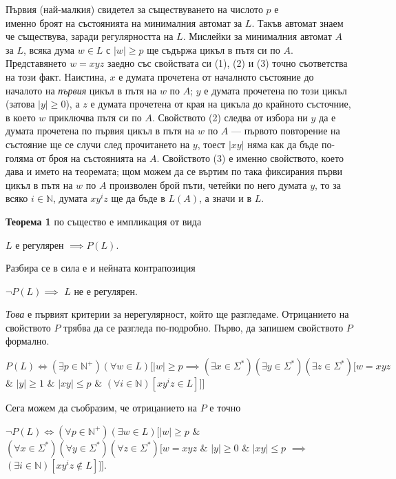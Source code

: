\documentclass{article}
\begin{document}
    \vspace{15pt}

    \hspace{15pt}Първия (най-малкия) свидетел за съществуването на числото $p$ е \\
    именно броят на състоянията на минималния автомат за $L$. Такъв автомат знаем че 
    съществува, заради регулярността на $L$. Мислейки за минималния автомат $A$ за $L$,
    всяка дума $w \in L$ с $|w| \geq p$ ще съдържа цикъл в пътя си по $A$. Представянето
    $w = xyz$ заедно със свойствата си (1), (2) и (3) точно съответства на този факт.
    Наистина, $x$ е думата прочетена от началното състояние до началото на \textit{първия}
    цикъл в пътя на $w$ по $A$; 
    $y$ е думата прочетена по този цикъл (затова $|y| \geq 0$), а $z$ е думата прочетена
    от края на цикъла до крайното състочние, в което $w$ приключва пътя си по $A$. 
    Свойството (2) следва от избора ни $y$ да е думата прочетена по първия цикъл в пътя
    на $w$ по $A$ — първото повторение на състояние ще се случи след прочитането на $y$,
    тоест $|xy|$ няма как да бъде по-голяма от броя на състоянията на $A$. Свойството
    (3) е именно свойството, което дава и името на теоремата; щом можем да се въртим
    по така фиксирания първи цикъл в пътя на $w$ по $A$ произволен брой пъти, четейки
    по него думата $y$, то за всяко $i \in \mathbb{N}$, думата $xy^iz$ ще да бъде в
    $L(A)$, а значи и в $L$. \\

    \vspace{15pt}

    \hspace{15pt} \textbf{Теорема 1} по същество е импликация от вида 
    \begin{center}
        $L$ е регулярен $\implies P(L)$. 
    \end{center}
    Разбира се в сила е и нейната контрапозиция
    \begin{center}
        $\neg P(L) \implies$ $L$ не е регулярен.
    \end{center}
    \textit{Това} е първият критерии за нерегулярност, който ще разгледаме. Отрицанието
    на свойството $P$ трябва да се разгледа по-подробно. Първо, да запишем свойството
    $P$ формално.
    \begin{center} 
        $P(L) \iff (\exists p \in \mathbb{N}^+)(\forall w \in L)[|w| \geq p \implies (\exists x \in \Sigma^*)(\exists y \in \Sigma^*)(\exists z \in \Sigma^*)[w = xyz$ $\&$ $|y| \geq 1$ $\&$ $|xy| \leq p$ $\&$ $(\forall i \in \mathbb{N})[xy^iz \in L]]]$
    \end{center}
    Сега можем да съобразим, че отрицанието на $P$ е точно
    \begin{center}
        $\neg P(L) \iff (\forall p \in \mathbb{N}^+)(\exists w \in L) [|w| \geq p$ $\&$ $(\forall x \in \Sigma^*)(\forall y \in \Sigma^*)(\forall z \in \Sigma^*)[w = xyz$ $\&$ $|y| \geq 0$ $\&$ $|xy| \leq p$ $\implies$ $(\exists i \in \mathbb{N})[xy^iz \notin L]]]$.
    \end{center}
\end{document}
